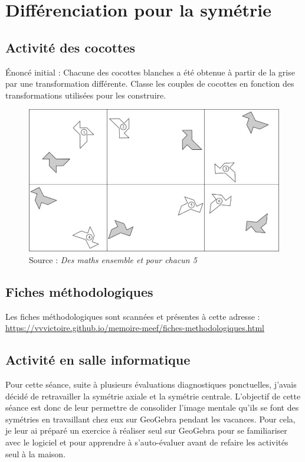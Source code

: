 \section{Différenciation pour la symétrie}

\subsection{Activité des cocottes}\label{annexe:symetrie-act}

Énoncé initial : Chacune des cocottes blanches a été obtenue à partir de la grise par une transformation différente.  Classe les couples de cocottes en fonction des transformations utilisées pour les construire.

\begin{figure}[h!]
    \centering
    \includegraphics[width=0.9\linewidth]{img/activitemepcc.jpg}
    \caption{Source : \textit{Des maths ensemble et pour chacun 5}}
    \label{fig:symetrie-act}
\end{figure}

\subsection{Fiches méthodologiques}\label{annexe:symetrie-fiches}

Les fiches méthodologiques sont scannées et présentes à cette adresse : \url{https://vvvictoire.github.io/memoire-meef/fiches-methodologiques.html}

\subsection{Activité en salle informatique}\label{annexe:symetrie-tice}

Pour cette séance, suite à plusieurs évaluations diagnostiques ponctuelles, j'avais décidé de retravailler la symétrie axiale et la symétrie centrale. L'objectif de cette séance est donc de leur permettre de consolider l'image mentale qu'ils se font des symétries en travaillant chez eux sur GeoGebra pendant les vacances. Pour cela, je leur ai préparé un exercice à réaliser seul sur GeoGebra pour se familiariser avec le logiciel et pour apprendre à s'auto-évaluer avant de refaire les activités seul à la maison.

